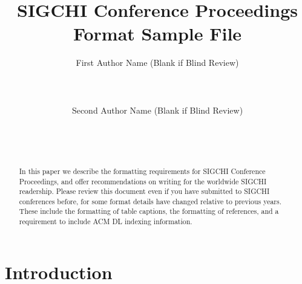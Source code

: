 \documentclass{chi2012}
\begin{document}

\title{SIGCHI Conference Proceedings Format Sample File}
\author{
  \alignauthor First Author Name (Blank if Blind Review)\\
    \\
    \\
    \\
  \alignauthor Second Author Name (Blank if Blind Review)\\
    \\
    \\
    \\
}

\maketitle

\begin{abstract}
In this paper we describe the formatting requirements for
SIGCHI Conference Proceedings, and offer recommendations
on writing for the worldwide SIGCHI readership.  Please
review this document even if you have submitted to SIGCHI
conferences before, for some format details have changed
relative to previous years. These include the formatting
of table captions, the formatting of references, and a
requirement to include ACM DL indexing information.
\end{abstract}




\section{Introduction}
\end{document}
